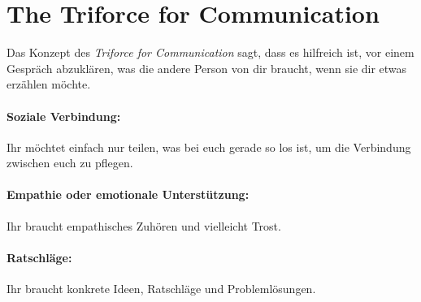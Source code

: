\section{The Triforce for Communication}
\label{triforce-communication}

Das Konzept des \emph{Triforce for Communication}\cite{triforce-of-communication} sagt, dass es hilfreich ist, vor einem Gespräch abzuklären, was die andere Person von dir braucht, wenn sie dir etwas erzählen möchte.

\paragraph{ Soziale Verbindung:} Ihr möchtet einfach nur teilen, was bei euch gerade so los ist, um die Verbindung zwischen euch zu pflegen.

\paragraph{ Empathie oder emotionale Unterstützung:} Ihr braucht empathisches Zuhören und vielleicht Trost.

\paragraph{ Ratschläge:} Ihr braucht konkrete Ideen, Ratschläge und Problemlösungen.
